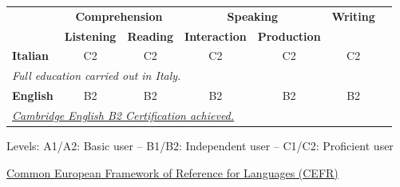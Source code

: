 \documentclass[a4paper, 10pt]{article}
\begin{document}


\renewcommand{\arraystretch}{1.3}
\begin{tabularx}{\textwidth}{lcccccc}
	\toprule
	& \multicolumn{2}{c}{\textbf{Comprehension}} & \multicolumn{2}{c}{\textbf{Speaking}} & \multicolumn{1}{c}{\textbf{Writing}} \\[3pt]
	\cmidrule(lr){2-3} \cmidrule(lr){4-5}
	& \textbf{Listening} & \textbf{Reading} & \textbf{Interaction} & \textbf{Production} \\
	\midrule
	\textbf{Italian} & C2 & C2 & C2 & C2 & C2 \\
	\multicolumn{6}{l}{\textit{Full education carried out in Italy.}} \\[3pt]
	\textbf{English} & B2 & B2 & B2 & B2 & B2 \\
	\multicolumn{6}{l}{\href{https://github.com/ShyVortex/angelo-resume/blob/main/Certs/B2Cert.pdf}{\textit{Cambridge English B2 Certification achieved.}}} \\
	\bottomrule
\end{tabularx}

\vspace{4pt}
{\footnotesize
	Levels: A1/A2: Basic user – B1/B2: Independent user – C1/C2: Proficient user \par
	\href{http://europass.cedefop.europa.eu/it/resources/european-language-levels-cefr}{Common European Framework of Reference for Languages (CEFR)}
}
\end{document}
